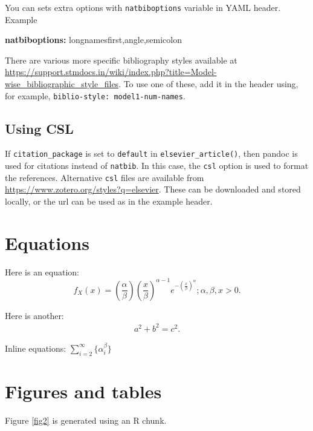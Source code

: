 \documentclass[preprint, 3p,
authoryear]{elsarticle} %
\newenvironment{Shaded}{\begin{snugshade}}{\end{snugshade}}
\newcommand{\AttributeTok}[1]{\textcolor[rgb]{0.13,0.29,0.53}{#1}}
\newcommand{\FunctionTok}[1]{\textcolor[rgb]{0.13,0.29,0.53}{\textbf{#1}}}
\newcommand{\KeywordTok}[1]{\textcolor[rgb]{0.13,0.29,0.53}{\textbf{#1}}}
\begin{document}
You can sets extra options with \texttt{natbiboptions} variable in YAML
header. Example

\begin{Shaded}
\begin{Highlighting}[]
\FunctionTok{natbiboptions}\KeywordTok{:}\AttributeTok{ longnamesfirst,angle,semicolon}
\end{Highlighting}
\end{Shaded}

There are various more specific bibliography styles available at
\url{https://support.stmdocs.in/wiki/index.php?title=Model-wise_bibliographic_style_files}.
To use one of these, add it in the header using, for example,
\texttt{biblio-style:\ model1-num-names}.

\subsection{Using CSL}\label{using-csl}

If \texttt{citation\_package} is set to \texttt{default} in
\texttt{elsevier\_article()}, then pandoc is used for citations instead
of \texttt{natbib}. In this case, the \texttt{csl} option is used to
format the references. Alternative \texttt{csl} files are available from
\url{https://www.zotero.org/styles?q=elsevier}. These can be downloaded
and stored locally, or the url can be used as in the example header.

\section{Equations}\label{equations}

Here is an equation: \[ 
  f_{X}(x) = \left(\frac{\alpha}{\beta}\right)
  \left(\frac{x}{\beta}\right)^{\alpha-1}
  e^{-\left(\frac{x}{\beta}\right)^{\alpha}}; 
  \alpha,\beta,x > 0 .
\]

Here is another: \begin{align}
  a^2+b^2=c^2.
\end{align}

Inline equations: \(\sum_{i = 2}^\infty\{\alpha_i^\beta\}\)

\section{Figures and tables}\label{figures-and-tables}

Figure \ref{fig2} is generated using an R chunk.
\end{document}
